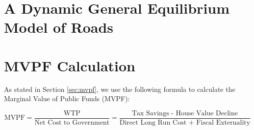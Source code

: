 



\section{A Dynamic General Equilibrium Model of Roads} \label{sec:appxdmodel}




\section{MVPF Calculation}

As stated in Section \ref{sec:mvpf}, we use the following formula to calculate the Marginal Value of Public Funds (MVPF):

\begin{equation}
    \text{MVPF} = \frac{\text{WTP}}{\text{Net Cost to Government}} = \frac{\text{Tax Savings - House Value Decline}}{\text{Direct Long Run Cost + Fiscal Externality}}
\end{equation}

